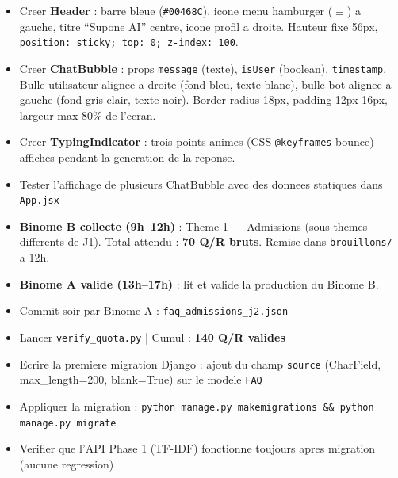 \documentclass[11pt,a4paper]{article}
\begin{document}
\begin{reactbox}[Frontend --- J2]
\begin{itemize}
    \item[$\square$] Creer \textbf{Header} : barre bleue (\texttt{\#00468C}), icone menu hamburger ($\equiv$) a gauche, titre ``Supone AI'' centre, icone profil a droite. Hauteur fixe 56px, \texttt{position: sticky; top: 0; z-index: 100}.
    \item[$\square$] Creer \textbf{ChatBubble} : props \texttt{message} (texte), \texttt{isUser} (boolean), \texttt{timestamp}. Bulle utilisateur alignee a droite (fond bleu, texte blanc), bulle bot alignee a gauche (fond gris clair, texte noir). Border-radius 18px, padding 12px 16px, largeur max 80\% de l'ecran.
    \item[$\square$] Creer \textbf{TypingIndicator} : trois points animes (CSS \texttt{@keyframes} bounce) affiches pendant la generation de la reponse.
    \item[$\square$] Tester l'affichage de plusieurs ChatBubble avec des donnees statiques dans \texttt{App.jsx}
\end{itemize}
\end{reactbox}

\begin{databox}[Data --- J2]
\begin{itemize}
    \item[$\square$] \textbf{Binome B collecte (9h--12h)} : Theme 1 --- Admissions (sous-themes differents de J1). Total attendu : \textbf{70 Q/R bruts}. Remise dans \texttt{brouillons/} a 12h.
    \item[$\square$] \textbf{Binome A valide (13h--17h)} : lit et valide la production du Binome B.
    \item[$\square$] Commit soir par Binome A : \texttt{faq\_admissions\_j2.json}
    \item[$\square$] Lancer \texttt{verify\_quota.py} | Cumul : \textbf{140 Q/R valides}
\end{itemize}
\end{databox}

\begin{dbbox}
\begin{itemize}
    \item[$\square$] Ecrire la premiere migration Django : ajout du champ \texttt{source} (CharField, max\_length=200, blank=True) sur le modele \texttt{FAQ}
    \item[$\square$] Appliquer la migration : \texttt{python manage.py makemigrations \&\& python manage.py migrate}
    \item[$\square$] Verifier que l'API Phase 1 (TF-IDF) fonctionne toujours apres migration (aucune regression)
\end{itemize}
\end{dbbox}
\end{document}
